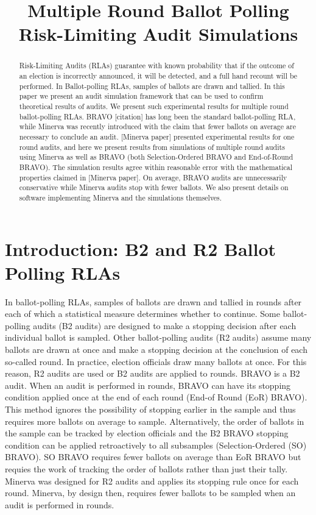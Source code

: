 \documentclass{article}
\title{Multiple Round Ballot Polling Risk-Limiting Audit Simulations}
\author{ }
\date{ }
\begin{document}
\maketitle

\begin{abstract}
    Risk-Limiting Audits (RLAs) guarantee with known probability 
    that if the outcome of an 
    election is incorrectly announced, it will be detected, 
    and a full hand recount will be performed. 
    In Ballot-polling RLAs, samples of ballots are drawn and tallied.
    In this paper we present an audit simulation framework
    that can be used to confirm theoretical results of audits.
    We present such experimental results for multiple round 
    ballot-polling RLAs.
    BRAVO [citation] has long been the standard ballot-polling RLA,
    while Minerva was recently introduced with the claim
    that fewer ballots on average are necessary to conclude 
    an audit.
    [Minerva paper] presented experimental
    results for one round audits, and here
    we present results
    from simulations of multiple round audits using Minerva 
    as well as BRAVO 
    (both Selection-Ordered 
    BRAVO and End-of-Round BRAVO).
    The simulation results agree within reasonable error with
    the mathematical properties claimed in [Minerva paper].
    On average, BRAVO audits are unnecessarily conservative 
    while Minerva audits stop with fewer ballots. We also
    present details on software implementing Minerva and
    the simulations themselves.
\end{abstract}

\section{Introduction: B2 and R2 Ballot Polling RLAs}
In ballot-polling RLAs, samples of ballots are drawn and tallied
in rounds
after each of which a statistical measure determines whether to
continue. 
Some ballot-polling audits (B2 audits) 
are designed to make a stopping decision
after each individual ballot is sampled.
Other ballot-polling audits (R2 audits) assume many ballots are drawn
at once and make a stopping decision at the conclusion of each 
so-called round.
In practice, election officials draw many ballots at once.
For this reason, R2 audits are used or B2 audits are applied to 
rounds.
BRAVO is a B2 audit. 
When an audit is performed in rounds, BRAVO can have its
stopping condition applied once at the end of each round
(End-of Round (EoR) BRAVO).
This method ignores the possibility of stopping earlier in the 
sample and thus requires more ballots on average to sample.
Alternatively, the order of ballots in the sample can be tracked
by election officials and the B2 BRAVO stopping condition can 
be applied retroactively to all subsamples 
(Selection-Ordered (SO) BRAVO).
SO BRAVO requires fewer ballots on average than EoR BRAVO but
requies the work of tracking the order of ballots rather than
just their tally.
Minerva was designed for R2 audits and applies its stopping rule
once for each round.
Minerva, by design then, requires fewer ballots to be sampled when 
an audit is performed in rounds.
\end{document}
